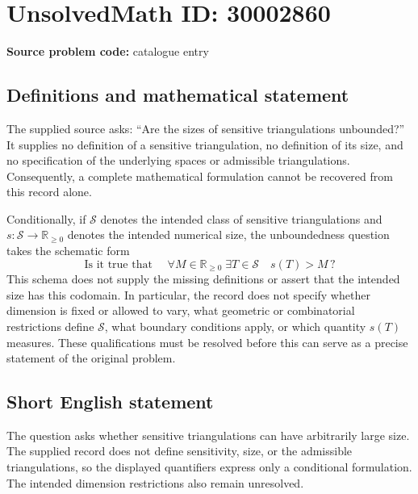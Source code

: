 \documentclass[11pt]{article}
\newcommand{\R}{\mathbb{R}}
\begin{document}
\section*{UnsolvedMath ID: 30002860}
\textbf{Source problem code:} catalogue entry
\subsection{Definitions and mathematical statement}
The supplied source asks: ``Are the sizes of sensitive triangulations unbounded?'' It supplies no definition of a sensitive triangulation, no definition of its size, and no specification of the underlying spaces or admissible triangulations. Consequently, a complete mathematical formulation cannot be recovered from this record alone.

Conditionally, if \(\mathcal{S}\) denotes the intended class of sensitive triangulations and \(s\colon\mathcal{S}\to\R_{\geq 0}\) denotes the intended numerical size, the unboundedness question takes the schematic form
\[
\text{Is it true that }\quad
\forall M\in\R_{\geq 0}\;\exists T\in\mathcal{S}\quad s(T)>M\,?
\]
This schema does not supply the missing definitions or assert that the intended size has this codomain. In particular, the record does not specify whether dimension is fixed or allowed to vary, what geometric or combinatorial restrictions define \(\mathcal{S}\), what boundary conditions apply, or which quantity \(s(T)\) measures. These qualifications must be resolved before this can serve as a precise statement of the original problem.
\subsection{Short English statement}
The question asks whether sensitive triangulations can have arbitrarily large size. The supplied record does not define sensitivity, size, or the admissible triangulations, so the displayed quantifiers express only a conditional formulation. The intended dimension restrictions also remain unresolved.
\end{document}

